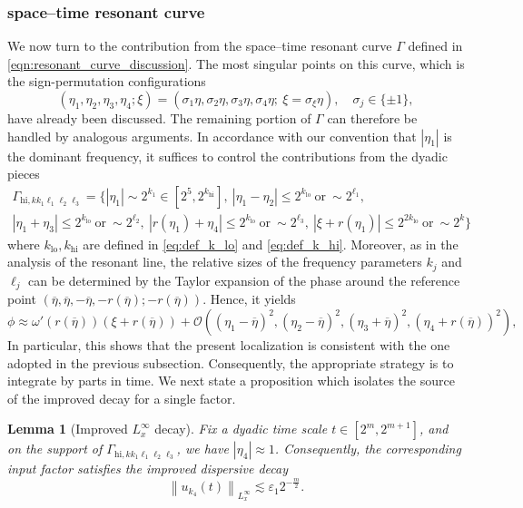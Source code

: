 \documentclass[reqno,english,11pt]{amsart}
\newcommand{\eps}{\varepsilon}
\newcommand{\snorm}[1]{\left\|#1\right\|}
\newtheorem{lemma}[theorem]{Lemma}
\theoremstyle{definition}
\numberwithin{equation}{section}
\begin{document}
\subsubsection{space--time resonant curve}\label{STR_curves}
\noindent We now turn to the contribution from the space--time resonant curve
$\Gamma$ defined in \eqref{eqn:resonant_curve_discussion}. The most singular points on this curve, which is the sign-permutation configurations
$$
(\eta_1,\eta_2,\eta_3,\eta_4;\xi)
= (\sigma_1 \eta,\sigma_2 \eta,\sigma_3 \eta,\sigma_4 \eta;\ \xi=\sigma_\xi \eta),
\quad \sigma_j\in\{\pm1\},
$$ have already been discussed. The remaining portion of $\Gamma$ can therefore
be handled by analogous arguments. In accordance with our convention that $|\eta_1|$ is the dominant frequency, it suffices to control the contributions from the dyadic pieces 
\begin{multline*}
\Gamma_{\text{hi}, kk_1\ell_1\ell_2\ell_3} = \Big\{
    |\eta_1|\sim 2^{k_{1}}\in \left[2^5, 2^{k_{\operatorname{hi}}}\right], \ 
    |\eta_1 - \eta_2|\leq 2^{k_{\operatorname{lo}}} \ \text{or} \ \sim 2^{\ell_1}, \\
    |\eta_1 + \eta_3|\leq 2^{k_{\operatorname{lo}}} \ \text{or} \ \sim 2^{\ell_2}, \ 
    |r(\eta_1) + \eta_4|\leq 2^{k_{\operatorname{lo}}} \ \text{or} \ \sim 2^{\ell_3}, \ 
    |\xi + r(\eta_1)|\leq 2^{2k_{\operatorname{lo}}} \ \text{or} \ \sim 2^{k}
\Big\}
\end{multline*}
where $k_{\operatorname{lo}}, k_{\operatorname{hi}}$ are defined in \eqref{eq:def_k_lo} and \eqref{eq:def_k_hi}. Moreover, as in the analysis of the resonant line, the relative sizes of the
frequency parameters $k_j$ and $\ell_j$ can be determined by the Taylor expansion
of the phase around the reference point $\left(\overline{\eta},\overline{\eta}, -\overline{\eta}, -r\left(\overline{\eta}\right) ;-r\left(\overline{\eta}\right)\right)$. Hence, it yields
    $$
    \phi \approx \omega'\left(r(\overline{\eta})\right)\left(\xi+r(\overline{\eta})\right) + \mathcal{O}\left(\left(\eta_1-\overline{\eta}\right)^2, \left(\eta_2-\overline{\eta}\right)^2, \left(\eta_3+\overline{\eta}\right)^2,\left(\eta_4+r(\overline{\eta})\right)^2\right),
    $$
    In particular, this shows that the present localization is consistent with the one adopted in the previous subsection. Consequently, the appropriate strategy is to integrate by parts in time. We next state a proposition which isolates the source of the improved decay for a single factor.
\begin{lemma}[Improved $L^\infty_x$ decay]\label{prop:eta4_improved_decay}
Fix a dyadic time scale $t\in[2^m,2^{m+1}]$, and 
on the support of $\Gamma_{\mathrm{hi},kk_1\ell_1\ell_2\ell_3}$, we have $|\eta_4|\approx 1$.
Consequently, the corresponding input factor satisfies the improved dispersive decay
$$
\snorm{u_{k_4}(t)}_{L^\infty_x}\lesssim \eps_1 2^{-\frac{m}{2}}.
$$
\end{lemma}
\end{document}

